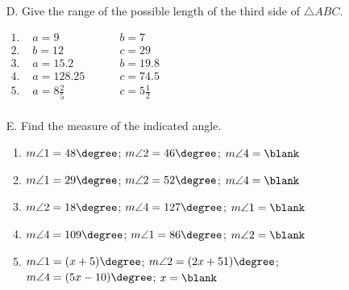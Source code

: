 \def\figdir{/storage/emulated/0/Documents/documents/latex/1920/Grade-8/3rd/inequalities-in-one-triangle/f}


\begin{enumerate}[label = \arabic*. ]
\item[D. ] \hspce Give the range of the possible length of the third side of $\triangle ABC$. 

\vspace*{5ex}\hspace*{17em}
\vspace*{-7ex}

$
\begin{array}{llll}
1. \phantom{i} & a=9 & \phantom{mn} & b=7 \\
2. &	b=12 &	& c=29\\
3. &	a=15.2 &	& b=19.8 \\
4. & a=128.25 & & c=74.5 \\
5. &	a=8 \displaystyle \frac{2}{5} &	& c=5 \displaystyle \frac{1}{2}\\
\end{array}
$

\item[E. ] \hspce Find the measure of the indicated angle. 
\begin{enumerate}[label = \arabic*. ]
\item $m\angle{1} = 48\degree$; $m\angle{2} = 46\degree$; $ m\angle{4} = \blank$
\item $m\angle{1} = 29\degree$; $ m\angle{2} = 52\degree$; $ m\angle{4} = \blank$
\item $m\angle{2} = 18\degree$; $ m\angle{4} = 127\degree$; $ m\angle{1} = \blank$
\item $m\angle{4} = 109\degree$; $ m\angle{1} = 86\degree$; $ m\angle{2} = \blank$
\item $m\angle{1} = (x+5)\degree$; $ m\angle{2} = (2x+51)\degree$; $ m\angle{4} = (5x-10)\degree$; $ x = \blank$
\end{enumerate}  
\end{enumerate}   


\vspace*{-19ex}\hspace*{22em}
\vspace*{4ex}

